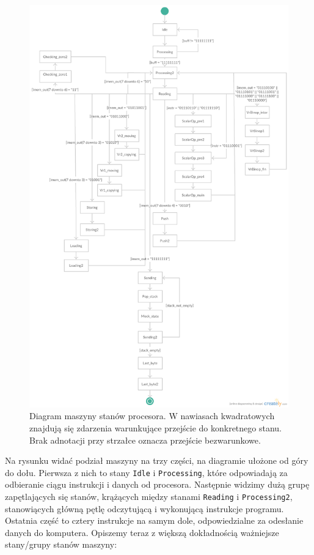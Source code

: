 \begin{figure}
  \begin{center}
    \includegraphics[scale=0.4]{images/Processor-State-Machine.png}
    \caption{Diagram maszyny stanów procesora. W nawiasach kwadratowych znajdują się zdarzenia warunkujące przejście do konkretnego stanu. Brak adnotacji przy strzałce oznacza przejście bezwarunkowe.}
    \label{fig:PSM}
  \end{center}
\end{figure}

Na rysunku widać podział maszyny na trzy części, na diagramie ułożone od góry do dołu. Pierwsza z nich to stany \texttt{Idle} i \texttt{Processing}, które odpowiadają za odbieranie ciągu instrukcji i danych od procesora. Następnie widzimy dużą grupę zapętlających się stanów, krążących między stanami \texttt{Reading} i \texttt{Processing2}, stanowiących główną pętlę odczytującą i wykonującą instrukcje programu. Ostatnia część to cztery instrukcje na samym dole, odpowiedzialne za odesłanie danych do komputera. Opiszemy teraz z większą dokładnością ważniejsze stany/grupy stanów maszyny:

